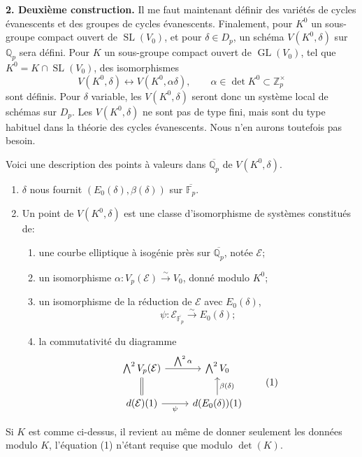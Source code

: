 \documentclass[11pt]{article}
\newcommand{\Fp}{\mathbb{F}_{p}}
\newcommand{\Qp}{\mathbb{Q}_{p}}
\newcommand{\Zp}{\mathbb{Z}_{p}}
\newcommand{\GL}{\operatorname{GL}}
\newcommand{\SL}{\operatorname{SL}}
\begin{document}
\textbf{2. Deuxième construction.} Il me faut maintenant définir des variétés de cycles évanescents et des groupes de cycles évanescents. Finalement, pour \(K^0\) un sous-groupe compact ouvert de \(\SL(V_0)\), et pour \(\delta\in D_p\), un schéma \(V(K^0,\delta)\) sur \(\Qp\) sera défini. Pour \(K\) un sous-groupe compact ouvert de \(\GL(V_0)\), tel que \(K^0=K\cap\SL(V_0)\), des isomorphismes
\[
V(K^0,\delta)\leftrightarrow V(K^0,\alpha\delta),
\qquad \alpha\in\det K^0\subset\Zp^\times
\]
sont définis. Pour \(\delta\) variable, les \(V(K^0,\delta)\) seront donc un système local de schémas sur \(D_p\). Les \(V(K^0,\delta)\) ne sont pas de type fini, mais sont du type habituel dans la théorie des cycles évanescents. Nous n'en aurons toutefois pas besoin.

Voici une description des points à valeurs dans \(\overline{\Qp}\) de \(V(K^0,\delta)\).
\begin{enumerate}[label=(\alph*)]
\item \(\delta\) nous fournit \((E_0(\delta),\beta(\delta))\) sur \(\overline{\Fp}\).
\item Un point de \(V(K^0,\delta)\) est une classe d'isomorphisme de systèmes constitués de:
\begin{enumerate}[label=(\arabic*)]
\item une courbe elliptique à isogénie près sur \(\overline{\Qp}\), notée \(\mathcal E\);
\item un isomorphisme \(\alpha:V_p(\mathcal E)\xrightarrow{\sim}V_0\), donné modulo \(K^0\);
\item un isomorphisme de la réduction de \(\mathcal E\) avec \(E_0(\delta)\),
\[
\psi:\mathcal E_{\overline{\Fp}}\xrightarrow{\sim}E_0(\delta);
\]
\item la commutativité du diagramme
\[
\begin{tikzcd}
\bigwedge^2 V_p(\mathcal E) \arrow[r,"\bigwedge^2\alpha"] \arrow[d,equal] &
\bigwedge^2 V_0\\
d(\mathcal E)(1) \arrow[r,"\psi"'] &
d(E_0(\delta))(1) \arrow[u,"\beta(\delta)"']
\end{tikzcd}
\tag{1}
\]
\end{enumerate}
\end{enumerate}
Si \(K\) est comme ci-dessus, il revient au même de donner seulement les données modulo \(K\), l'équation (1) n'étant requise que modulo \(\det(K)\).
\end{document}
